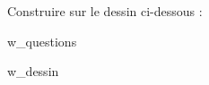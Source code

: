 \begin{exo}
    Construire sur le dessin ci-dessous :
    \begin{enumerate}
        {w_questions}
    \end{enumerate}
\end{exo}

    {w_dessin}


